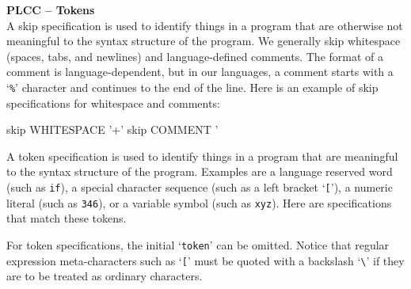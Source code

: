 \begin{minipage}[t]{\sw}
\slidenumber
\LARGE
{\bf PLCC -- Tokens}\\
\Large
A skip specification is used
to identify things in a program
that are otherwise not meaningful
to the syntax structure of the program.
We generally skip whitespace (spaces, tabs, and newlines)
and language-defined comments.
The format of a comment is language-dependent,
but in our languages, a comment starts with a `\verb'%'' character
and continues to the end of the line.
Here is an example of skip specifications for whitespace and comments:
\begin{qv}
skip WHITESPACE '\s+'
skip COMMENT '%
\end{qv}
A token specification is used to identify things in a program
that are meaningful to the syntax structure of the program.
Examples are a language reserved word (such as \verb'if'),
a special character sequence (such as a left bracket `\verb'[''),
a numeric literal (such as \verb'346'),
or a variable symbol (such as \verb'xyz').
Here are specifications that match these tokens.
For token specifications, the initial `\verb'token'' can be omitted.
Notice that regular expression meta-characters such as `\verb'[''
must be quoted with a backslash `\verb'\''
if they are to be treated as ordinary characters.
\end{minipage}
\clearpage
